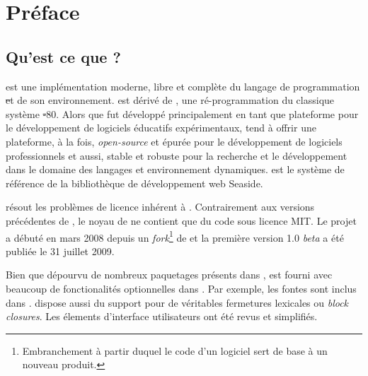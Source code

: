 \documentclass[a4paper,10pt,twoside]{book}
\begin{document}
    \sloppy
    \frontmatter
\fi
\renewcommand{\nnbb}[2]{} %
\sloppy
\chapter{Préface}

\section*{Qu'est ce que \pharo?}

\pharo est une implémentation moderne, libre et complète du
langage de programmation \st et de son environnement. \pharo est
dérivé de \squeak\cite{Inga97a}, une ré-programmation du classique
système \st-80. Alors que \squeak fut développé principalement en tant que
plateforme pour le développement de logiciels éducatifs
expérimentaux, \pharo tend à offrir une plateforme,
à la fois, \emph{open-source} et épurée pour le développement de
logiciels professionnels et aussi, stable et robuste pour la recherche 
et le développement dans le domaine des langages et environnement dynamiques. 
\pharo est le système de référence de la bibliothèque de développement web
 Seaside. %

\pharo résout les problèmes de licence inhérent à \squeak. 
Contrairement aux versions précédentes de \squeak, le noyau
de \pharo ne contient que du code sous licence MIT. Le projet \pharo
a débuté en mars 2008 depuis un \emph{fork}\footnote{Embranchement à
partir duquel le code d'un logiciel sert de base à un nouveau produit.}
de  et la première version 1.0 \emph{beta} a été publiée le
31 juillet 2009. %

Bien que dépourvu de nombreux paquetages présents dans \squeak, \pharo
est fourni avec beaucoup de fonctionalités optionnelles dans \squeak.
Par exemple, les fontes \truetype sont inclus dans \pharo. \pharo
dispose aussi du support pour de véritables fermetures lexicales ou
\emph{block closures}. Les élements d'interface utilisateurs ont été
revus et simplifiés. %
\end{document}
